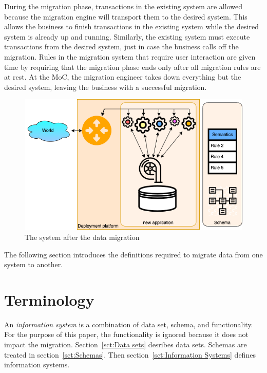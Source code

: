 \documentclass{elsarticle}
\begin{document}
   During the migration phase, transactions in the existing system are allowed because the migration engine will transport them to the desired system.
   This allows the business to finish transactions in the existing system while the desired system is already up and running.
   Similarly, the existing system must execute transactions from the desired system, just in case the business calls off the migration.
   Rules in the migration system that require user interaction are given time by requiring that the migration phase ends
   only after all migration rules are at rest.
   At the MoC, the migration engineer takes down everything but the desired system,
   leaving the business with a successful migration.
\begin{figure}[bht]
   \begin{center}
     \includegraphics[scale=.35]{figures/datamigration-Post-migration.png}
   \end{center}
\caption{The system after the data migration}
\label{fig:post-migration}
\end{figure}

   The following section introduces the definitions required to migrate data from one system to another.

\section{Terminology}
\label{sct:Terminology}
   An {\em information system} is a combination of data set, schema, and functionality.
   For the purpose of this paper, the functionality is ignored because it does not impact the migration.
   Section~\ref{sct:Data sets} desribes data sets. Schemas are treated in section~\ref{sct:Schemas}.
   Then section~\ref{sct:Information Systems} defines information systems.
\end{document}
